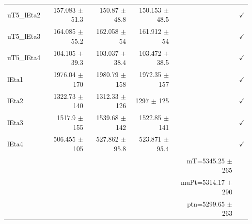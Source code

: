 \begin{table}[htbp]
\begin{tabular}{lrrrrr}
uT5\_lEta2 & 157.083 $\pm$ 51.3 & 150.87 $\pm$ 48.8 & 150.153 $\pm$ 48.5 &  & $\checkmark$ \\
uT5\_lEta3 & 164.085 $\pm$ 55.2 & 162.058 $\pm$ 54 & 161.912 $\pm$ 54 &  & $\checkmark$ \\
uT5\_lEta4 & 104.105 $\pm$ 39.3 & 103.037 $\pm$ 38.4 & 103.472 $\pm$ 38.5 &  & $\checkmark$ \\
\hline
lEta1 & 1976.04 $\pm$ 170 & 1980.79 $\pm$ 158 & 1972.35 $\pm$ 157 &  & $\checkmark$ \\
lEta2 & 1322.73 $\pm$ 140 & 1312.33 $\pm$ 126 & 1297 $\pm$ 125 &  & $\checkmark$ \\
lEta3 & 1517.9 $\pm$ 155 & 1539.68 $\pm$ 142 & 1522.85 $\pm$ 141 &  & $\checkmark$ \\
lEta4 & 506.455 $\pm$ 105 & 527.862 $\pm$ 95.8 & 523.871 $\pm$ 95.4 &  & $\checkmark$ \\
\hline
 &  &  &  & mT=5345.25 $\pm$ 265 &  \\
 &  &  &  & muPt=5314.17 $\pm$ 290 &  \\
 &  &  &  & ptn=5299.65 $\pm$ 263 &  \\
\hline
\end{tabular}
\end{table}